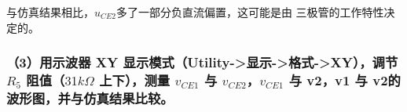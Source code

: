 \documentclass[UTF8]{ctexart}
\begin{document}
\begin{figure}[htbp]
  \centering
\end{figure}

与仿真结果相比，$u_{CE2}$多了一部分负直流偏置，这可能是由
三极管的工作特性决定的。

\subsubsection*{
（3）用示波器 XY 显示模式（Utility->显示->格式->XY），调节 $R_5$ 阻值（$31k \Omega$
上下），测量 $v_{CE1}$ 与 $v_{CE2}$，$v_{CE1}$ 与 v2，v1 与 v2的波形图，并与仿真结果比较。
}
\end{document}
